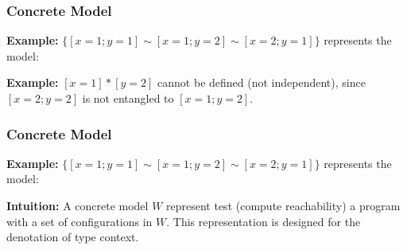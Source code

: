 \begin{frame}[fragile]
    \frametitle{Concrete Model}

\textbf{Example:} $\{[x=1;y=1] \sim [x=1;y=2] \sim [x=2;y=1]\}$ represents the model:


    \textbf{Example:} $[x=1] * [y = 2]$ cannot be defined (not independent), since $[x=2;y=2]$ is not entangled to $[x=1;y=2]$.
\end{frame}

\begin{frame}[fragile]
    \frametitle{Concrete Model}

\textbf{Example:} $\{[x=1;y=1] \sim [x=1;y=2] \sim [x=2;y=1]\}$ represents the model:


    \textbf{Intuition:} A concrete model $W$ represent test (compute reachability) a program with a set of configurations in $W$. This representation is designed for the denotation of type context.
\end{frame}


